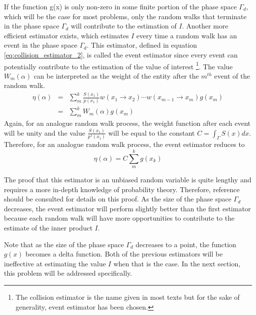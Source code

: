 If the function g(x) is only non-zero in some finite portion of the phase space
$\Gamma_d$, which will be the case for most problems, only the random walks 
that terminate in the phase space $\Gamma_d$ will contribute to the 
estimation of $I$. Another more efficient estimator exists, which estimates $I$
every time a random walk has an event in the phase space $\Gamma_d$. This 
estimator, defined in equation \ref{eq:collision_estimator_2}, is called the 
event estimator since every event can potentially contribute to the estimation 
of the value of interest \footnote{The collision estimator is the name given
in most texts but for the sake of generality, event estimator has been 
chosen.}. The value $W_m(\alpha)$ can be interpreted as the weight of the 
entity after the $m^{th}$ event of the random walk.
\begin{eqnarray}
  \eta(\alpha) & = & \sum_m^k \frac{S(x_1)}{p(x_1)}w(x_1 \to x_2) \cdots 
  w(x_{m-1} \to x_m) g(x_m) \nonumber \\
  & = & \sum_m^k W_m(\alpha) g(x_m)
  \label{eq:collision_estimator_2}
\end{eqnarray}
Again, for an analogue random walk process, the weight function after each 
event will be unity and the value $\frac{S(x_1)}{p^1(x_1)}$ will be equal to 
the constant $C = \int_{\Gamma} S(x)dx$. Therefore, for an analogue random walk 
process, the event estimator reduces to
\begin{equation*}
  \eta(\alpha) = C \sum_m^k g(x_k)
\end{equation*}

The proof that this estimator is an unbiased random variable is quite lengthy 
and requires a more in-depth knowledge of probability theory. Therefore, 
reference \cite{spanier_monte_1969} should be consulted for details on this 
proof. As the size of the phase space $\Gamma_d$ decreases, the event estimator 
will perform slightly better than the first estimator because each random walk 
will have more opportunities to contribute to the estimate of the inner product
$I$. 

Note that as the size of the phase space $\Gamma_d$ decreases to a point, the 
function $g(x)$ becomes a delta function. Both of the previous estimators 
will be ineffective at estimating the value $I$ when that is the case. In the 
next section, this problem will be addressed specifically.

